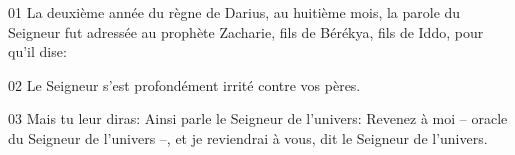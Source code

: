 01 La deuxième année du règne de Darius, au huitième mois, la parole du Seigneur fut adressée au prophète Zacharie, fils de Bérékya, fils de Iddo, pour qu’il dise:

02 Le Seigneur s’est profondément irrité contre vos pères.

03 Mais tu leur diras: Ainsi parle le Seigneur de l’univers: Revenez à moi – oracle du Seigneur de l’univers –, et je reviendrai à vous, dit le Seigneur de l’univers.
